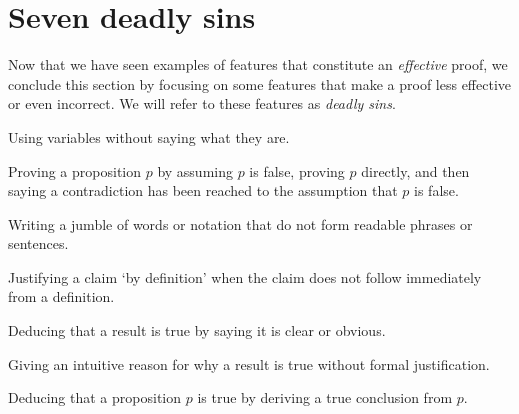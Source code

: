 \section{Seven deadly sins}
\label{secSevenDeadlySins}

Now that we have seen examples of features that constitute an \textit{effective} proof, we conclude this section by focusing on some features that make a proof less effective or even incorrect. We will refer to these features as \textit{deadly sins}.

\begin{deadlysin}
\label{dsAbuseOfVariables}
Using variables without saying what they are.
\end{deadlysin}


\begin{deadlysin}
\label{dsContradictionSandwich}
Proving a proposition $p$ by assuming $p$ is false, proving $p$ directly, and then saying a contradiction has been reached to the assumption that $p$ is false.
\end{deadlysin}


\begin{deadlysin}
\label{dsWordSalad}
Writing a jumble of words or notation that do not form readable phrases or sentences.
\end{deadlysin}


\begin{deadlysin}
\label{dsProofByDefinition}
Justifying a claim `by definition' when the claim does not follow immediately from a definition.
\end{deadlysin}


\begin{deadlysin}
\label{dsProofByCondescension}
Deducing that a result is true by saying it is clear or obvious.
\end{deadlysin}


\begin{deadlysin}
\label{dsProofByIntuition}
Giving an intuitive reason for why a result is true without formal justification.
\end{deadlysin}


\begin{deadlysin}
\label{dsBackwardsLogic}
Deducing that a proposition $p$ is true by deriving a true conclusion from $p$.
\end{deadlysin}

